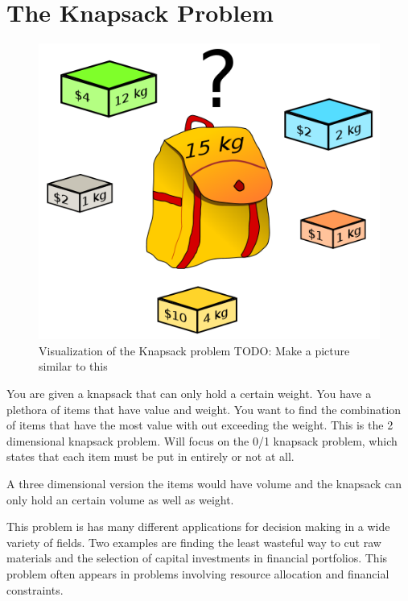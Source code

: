\label{Ch:Knapsack}


\section*{The Knapsack Problem}

\begin{figure}[H]
\includegraphics[scale = .3]{Knapsack.png}
\caption{Visualization of the Knapsack problem TODO: Make a picture similar to this}
\end{figure}

You are given a knapsack that can only hold a certain weight.
You have a plethora of items that have value and weight.
You want to find the combination of items that have the most value with out exceeding the weight.
This is the 2 dimensional knapsack problem.
Will focus on the 0/1 knapsack problem, which states that each item must be put in entirely or not at all.

A three dimensional version the items would have volume and the knapsack can only hold an certain volume as well as weight. 

This problem is has many different applications for decision making in a wide variety of fields.
Two examples are finding the least wasteful way to cut raw materials and the selection of capital investments in financial portfolios.
This problem often appears in problems involving resource allocation and financial constraints.

